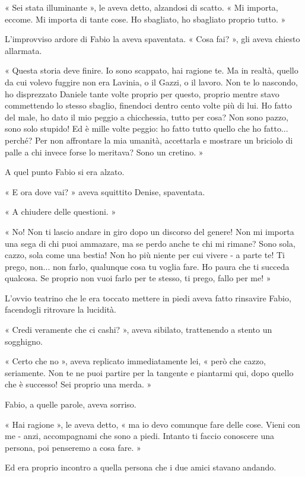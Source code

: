 « Sei stata illuminante », le aveva detto, alzandosi di scatto. « Mi importa, eccome. Mi importa di tante cose. Ho sbagliato, ho sbagliato proprio tutto. »

L'improvviso ardore di Fabio la aveva spaventata. « Cosa fai? », gli aveva chiesto allarmata.

« Questa storia deve finire. Io sono scappato, hai ragione te. Ma in realtà, quello da cui volevo fuggire non era Lavinia, o il Gazzi, o il lavoro. Non te lo nascondo, ho disprezzato Daniele tante volte proprio per questo, proprio mentre stavo commettendo lo stesso sbaglio, finendoci dentro cento volte più di lui. Ho fatto del male, ho dato il mio peggio a chicchessia, tutto per cosa? Non sono pazzo, sono solo stupido! Ed è mille volte peggio: ho fatto tutto quello che ho fatto... perché? Per non affrontare la mia umanità, accettarla e mostrare un briciolo di palle a chi invece forse lo meritava? Sono un cretino. »

A quel punto Fabio si era alzato.

« E ora dove vai? » aveva squittito Denise, spaventata.

« A chiudere delle questioni. »

« No! Non ti lascio andare in giro dopo un discorso del genere! Non mi importa una sega di chi puoi ammazare, ma se perdo anche te chi mi rimane? Sono sola, cazzo, sola come una bestia! Non ho più niente per cui vivere - a parte te! Ti prego, non... non farlo, qualunque cosa tu voglia fare. Ho paura che ti succeda qualcosa. Se proprio non vuoi farlo per te stesso, ti prego, fallo per me! »

L'ovvio teatrino che le era toccato mettere in piedi aveva fatto rinsavire Fabio, facendogli ritrovare la lucidità.

« Credi veramente che ci cashi? », aveva sibilato, trattenendo a stento un sogghigno.

« Certo che no », aveva replicato immediatamente lei, « però che cazzo, seriamente. Non te ne puoi partire per la tangente e piantarmi qui, dopo quello che è successo! Sei proprio una merda. »

Fabio, a quelle parole, aveva sorriso.

« Hai ragione », le aveva detto, « ma io devo comunque fare delle cose. Vieni con me - anzi, accompagnami che sono a piedi. Intanto ti faccio conoscere una persona, poi penseremo a cosa fare. »

Ed era proprio incontro a quella persona che i due amici stavano andando.


